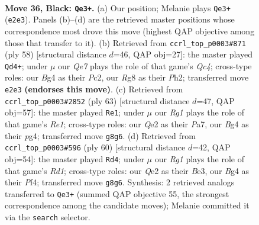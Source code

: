 \documentclass[11pt]{article}
\begin{document}
\clearpage

\begin{figure}[p]\centering
\begin{subfigure}{0.46\textwidth}\centering
\resizebox{\linewidth}{!}{%
\newchessgame
\chessboard[
  setfen={5kr1/p4p2/7p/2PBp1p1/6b1/8/P3q3/2K5 b - - 1 36},
  showmover=false,
  pgfstyle=straightmove, color=movearrow, markmove={e2-e3}
]}
\caption{}
\end{subfigure}\hfill
\begin{subfigure}{0.46\textwidth}\centering
\resizebox{\linewidth}{!}{%
\newchessgame
\chessboard[
  setfen={4r3/4b2p/1k3p2/8/rPQ2p2/8/2P3PP/2K5 w - - 8 30},
  showmover=false,
  pgfstyle=straightmove, color=movearrow, markmove={c4-d4}
]}
\caption{}
\end{subfigure}
\\[4pt]
\begin{subfigure}{0.46\textwidth}\centering
\resizebox{\linewidth}{!}{%
\newchessgame
\chessboard[
  setfen={4r1k1/pp3p1p/6p1/3B4/P5P1/5K1P/1P6/2N5 b - - 0 32},
  showmover=false,
  pgfstyle=straightmove, color=movearrow, markmove={e8-e1}
]}
\caption{}
\end{subfigure}\hfill
\begin{subfigure}{0.46\textwidth}\centering
\resizebox{\linewidth}{!}{%
\newchessgame
\chessboard[
  setfen={8/2k2p1r/1p6/4Pp2/b4P2/P3B3/2P5/2KR4 w - - 0 31},
  showmover=false,
  pgfstyle=straightmove, color=movearrow, markmove={d1-d4}
]}
\caption{}
\end{subfigure}
\caption{\textbf{Move 36, Black: \texttt{Qe3+}.} (a) Our position; Melanie plays \texttt{Qe3+} (\texttt{e2e3}). Panels (b)--(d) are the retrieved master positions whose correspondence most drove this move (highest QAP objective among those that transfer to it). (b) Retrieved from \texttt{ccrl\_top\_p0003\#871} (ply 58) [structural distance $d$=46, QAP obj=27]: the master played \texttt{Qd4+}; under $\mu$ our \emph{Qe7} plays the role of that game's \emph{Qc4}; cross-type roles: our \emph{B}g4 as their \emph{P}c2, our \emph{R}g8 as their \emph{P}h2; transferred move \texttt{e2e3} \textbf{(endorses this move)}. (c) Retrieved from \texttt{ccrl\_top\_p0003\#2852} (ply 63) [structural distance $d$=47, QAP obj=57]: the master played \texttt{Re1}; under $\mu$ our \emph{Rg1} plays the role of that game's \emph{Re1}; cross-type roles: our \emph{Q}e2 as their \emph{P}a7, our \emph{B}g4 as their \emph{p}g4; transferred move \texttt{g8g6}. (d) Retrieved from \texttt{ccrl\_top\_p0003\#596} (ply 60) [structural distance $d$=42, QAP obj=54]: the master played \texttt{Rd4}; under $\mu$ our \emph{Rg1} plays the role of that game's \emph{Rd1}; cross-type roles: our \emph{Q}e2 as their \emph{B}e3, our \emph{B}g4 as their \emph{P}f4; transferred move \texttt{g8g6}. Synthesis: 2 retrieved analogs transferred to \texttt{Qe3+} (summed QAP objective 55, the strongest correspondence among the candidate moves); Melanie committed it via the \texttt{search} selector.}
\label{fig:thought-m71}
\end{figure}
\end{document}
